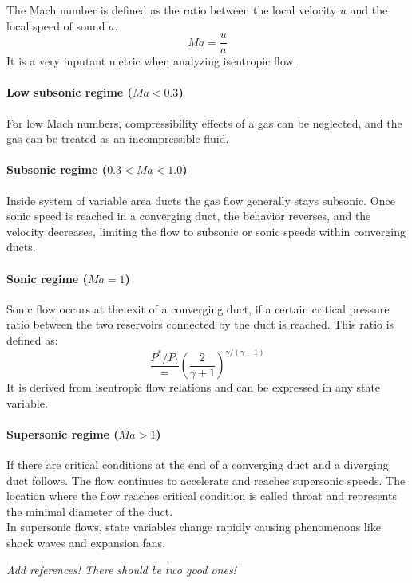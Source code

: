 
	The Mach number is defined as the ratio between the local velocity $u$ and the local speed of sound $a$.
	$$
		Ma = \frac{u}{a}
	$$
	It is a very inputant metric when analyzing isentropic flow.

\paragraph{Low subsonic regime (\(Ma < 0.3\))}

	For low Mach numbers, compressibility effects of a gas can be neglected, and the gas can be treated as an incompressible fluid.

\paragraph{Subsonic regime (\(0.3 < Ma < 1.0\))} 

	Inside system of variable area ducts the gas flow generally stays subsonic.
	Once sonic speed is reached in a converging duct, the behavior reverses, and the velocity decreases, limiting the flow to subsonic or sonic speeds within converging ducts.\\
	
		
\paragraph{Sonic regime (\(Ma = 1\))}
	
	Sonic flow occurs at the exit of a converging duct, if a certain critical pressure ratio between the two reservoirs connected by the duct is reached.
	This ratio is defined as:
	$$
		\frac{P^*/P_t}=\left(\frac{2}{\gamma + 1}\right)^{\gamma/(\gamma - 1)}
	$$ 
	It is derived from isentropic flow relations and can be expressed in any state variable.
\paragraph{Supersonic regime (\(Ma > 1\))} 

	If there are critical conditions at the end of a converging duct and a diverging duct follows.
	The flow continues to accelerate and reaches supersonic speeds.
	The location where the flow reaches critical condition is called throat and represents the minimal diameter of the duct.\\
	In supersonic flows, state variables change rapidly causing phenomenons like shock waves and expansion fans.
	
	

{\color{greenColor}\itshape
	Add references! There should be two good ones!
}
